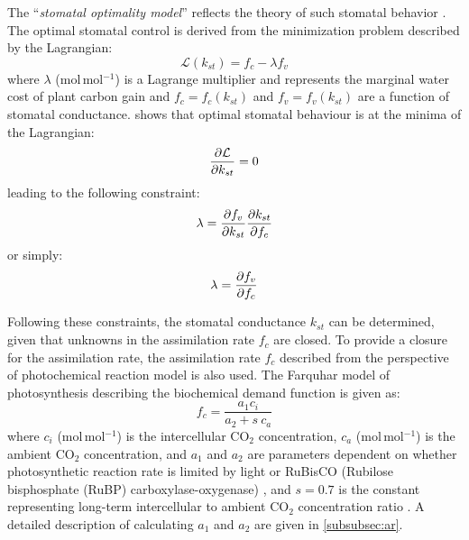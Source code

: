 The ``\textit{stomatal optimality model}'' reflects the theory of such stomatal behavior \citep{Cowan1978}. The optimal stomatal control is derived from the minimization problem described by the Lagrangian:
\begin{equation} 
\mathcal{L}(k_{st}) = f_c - \lambda f_v
\end{equation}
where $\lambda$ (mol\,mol$^{-1}$) is a Lagrange multiplier and represents the marginal water cost of plant carbon gain \citep{Medlyn2011,Katul2010,Manoli2014} and $f_c = f_c(k_{st})$ and $f_v=f_v(k_{st})$ are a function of stomatal conductance. \cite{Cowan1978} shows that optimal stomatal behaviour is at the minima of the Lagrangian:
\begin{equation}
\frac{\partial \mathcal{L}}{\partial k_{st}} = 0
\label{eq:lagrangian1}
\end{equation}
leading to the following constraint:
\begin{equation}
\lambda = \frac{\partial f_v}{\partial k_{st}}\frac{\partial k_{st}}{\partial f_c} 
\end{equation}
or simply:
\begin{equation}
\lambda = \frac{\partial f_v}{\partial f_c} 
\end{equation}

Following these constraints, the stomatal conductance $k_{\textit{st}}$ can be determined, given that unknowns in the assimilation rate $f_c$ are closed. To provide a closure for the assimilation rate, the assimilation rate $f_c$ described from the perspective of photochemical reaction model is also used. The Farquhar model of photosynthesis describing the biochemical demand function is given as:
\begin{equation}
f_c = \frac{a_1 c_i}{a_2 + s~c_a}
\label{eq:bioassim}
\end{equation}
where $c_i$ (mol\,mol$^{-1}$)  is the intercellular CO$_2$ concentration, $c_a$ (mol\,mol$^{-1}$) is the ambient CO$_2$ concentration, and $a_1$ and $a_2$ are parameters dependent on whether photosynthetic reaction rate is limited by light or RuBisCO (Rubilose bisphosphate (RuBP) carboxylase-oxygenase) \citep{Katul2010, Farquhar1980}, and $s=0.7$ is the constant representing long-term intercellular to ambient CO$_2$ concentration ratio \citep{Volpe2013}. A detailed description of calculating $a_1$ and $a_2$ are given in \cref{subsubsec:ar}.


